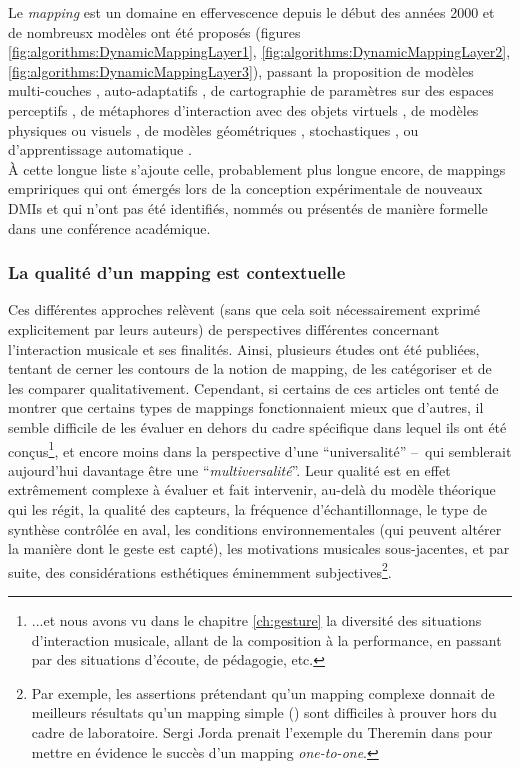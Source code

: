 \noindent Le \textit{mapping} est un domaine en effervescence depuis le début des années 2000 et de nombreusx modèles ont été proposés (figures \ref{fig:algorithms:DynamicMappingLayer1}, \ref{fig:algorithms:DynamicMappingLayer2}, \ref{fig:algorithms:DynamicMappingLayer3}), passant la proposition de modèles multi-couches \cite{wanderley_escher-modeling_1998, hunt_mapping_2002}, auto-adaptatifs \cite{verfaille_mapping_2006}, de cartographie de paramètres sur des espaces perceptifs \cite{wessel_timbre_1979, wyse_instrumentalizing_2010,schwarz_sound_2012, tubb_divergent_2014}, de métaphores d'interaction avec des objets virtuels \cite{wessel_intimate_2002}, de modèles physiques ou visuels \cite{momeni_dynamic_2006}, de modèles géométriques \cite{van_nort_choice_2004}, stochastiques \cite{dabby_musical_1996}, ou d'apprentissage automatique \cite{fiebrink_real-time_2011, caramiaux_mapping_2014, francoise_motion-sound_2015}.\\
\indent À cette longue liste s'ajoute celle, probablement plus longue encore, de mappings empririques qui ont émergés lors de la conception expérimentale de nouveaux \glspl{DMI} et qui n'ont pas été identifiés, nommés ou présentés de manière formelle dans une conférence académique.

\subsubsection{La qualité d'un mapping est contextuelle}

\noindent Ces différentes approches relèvent (sans que cela soit nécessairement exprimé explicitement par leurs auteurs) de perspectives différentes concernant l'interaction musicale et ses finalités. Ainsi, plusieurs études ont été publiées, tentant de cerner les contours de la notion de mapping, de les catégoriser et de les comparer qualitativement. Cependant, si certains de ces articles ont tenté de montrer que certains types de mappings fonctionnaient mieux que d'autres, il semble difficile de les évaluer en dehors du cadre spécifique dans lequel ils ont été conçus\footnote{...et nous avons vu dans le chapitre \ref{ch:gesture} la diversité des situations d'interaction musicale, allant de la composition à la performance, en passant par des situations d'écoute, de pédagogie, etc.}, et encore moins dans la perspective d'une ``universalité'' --~qui semblerait aujourd'hui davantage être une ``\textit{multiversalité}''. Leur qualité est en effet extrêmement complexe à évaluer et fait intervenir, au-delà du modèle théorique qui les régit, la qualité des capteurs, la fréquence d'échantillonnage, le type de synthèse contrôlée en aval, les conditions environnementales (qui peuvent altérer la manière dont le geste est capté), les motivations musicales sous-jacentes, et par suite, des considérations esthétiques éminemment subjectives\footnote{Par exemple, les assertions prétendant qu'un mapping complexe donnait de meilleurs résultats qu'un mapping simple (\cite{rovan_instrumental_1997, hunt_mapping_2000}) sont difficiles à prouver hors du cadre de laboratoire. Sergi Jorda prenait l'exemple du Theremin dans \cite{jorda_digital_2005} pour mettre en évidence le succès d'un mapping \textit{one-to-one}.}.

